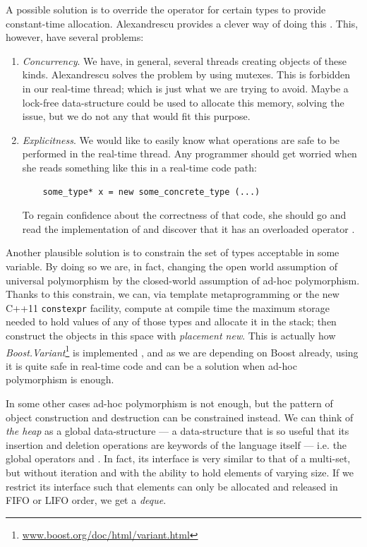 A possible solution is to override the operator  for certain
types to provide constant-time allocation. Alexandrescu provides a
clever way of doing this \cite{alexandrescu01modern}. This,
however, have several problems:

\begin{enumerate}
\item \emph{Concurrency}. We have, in general, several threads
  creating objects of these kinds. Alexandrescu solves the problem by
  using mutexes. This is forbidden in our real-time thread; which is
  just what we are trying to avoid. Maybe a lock-free data-structure
  could be used to allocate this memory, solving the issue, but we do
  not any that would fit this purpose.

\item \emph{Explicitness}. We would like to easily know what
  operations are safe to be performed in the real-time thread. Any
  programmer should get worried when she reads something like this in a
  real-time code path:
  \begin{lstlisting}
    some_type* x = new some_concrete_type (...)
  \end{lstlisting}
  To regain confidence about the correctness
  of that code, she should go and read the implementation of
   and discover that it has an
  overloaded operator .
\end{enumerate}

Another plausible solution is to constrain the set of types acceptable
in some variable. By doing so we are, in fact, changing the open world
assumption of universal polymorphism by
the closed-world assumption of ad-hoc polymorphism. Thanks to this
constrain, we can, via template metaprogramming or the new C++11
\texttt{constexpr} facility, compute at compile time the maximum
storage needed to hold values of any of those types and allocate it in
the stack; then construct the objects in this space with
\emph{placement new}. This is actually how 
\emph{Boost.Variant}\footnote{\url{www.boost.org/doc/html/variant.html}}
is implemented \cite{alexandrescu01unions}, and as we are depending on
Boost already, using it is quite safe in real-time code and can be a
solution when ad-hoc polymorphism is enough.

In some other cases ad-hoc polymorphism is not enough, but the pattern
of object construction and destruction can be constrained instead. We
can think of \emph{the heap} as a global data-structure --- a
data-structure that is so useful that its insertion and deletion
operations are keywords of the language itself --- i.e. the global
operators  and . In fact, its interface is very
similar to that of a multi-set, but without iteration and with the
ability to hold elements of varying size. If we restrict its interface
such that elements can only be allocated and released in FIFO or LIFO
order, we get a \emph{deque}.

